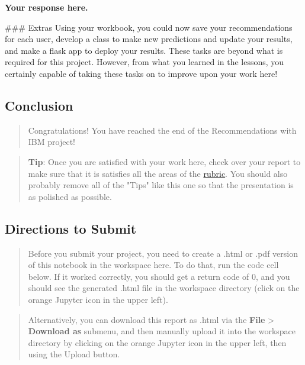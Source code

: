 \documentclass[11pt]{article}
\begin{document}
    \textbf{Your response here.}

     \#\#\# Extras Using your workbook, you could now save your
recommendations for each user, develop a class to make new predictions
and update your results, and make a flask app to deploy your results.
These tasks are beyond what is required for this project. However, from
what you learned in the lessons, you certainly capable of taking these
tasks on to improve upon your work here!

\subsection{Conclusion}\label{conclusion}

\begin{quote}
Congratulations! You have reached the end of the Recommendations with
IBM project!
\end{quote}

\begin{quote}
\textbf{Tip}: Once you are satisfied with your work here, check over
your report to make sure that it is satisfies all the areas of the
\href{https://review.udacity.com/\#!/rubrics/2322/view}{rubric}. You
should also probably remove all of the "Tips" like this one so that the
presentation is as polished as possible.
\end{quote}

\subsection{Directions to Submit}\label{directions-to-submit}

\begin{quote}
Before you submit your project, you need to create a .html or .pdf
version of this notebook in the workspace here. To do that, run the code
cell below. If it worked correctly, you should get a return code of 0,
and you should see the generated .html file in the workspace directory
(click on the orange Jupyter icon in the upper left).
\end{quote}

\begin{quote}
Alternatively, you can download this report as .html via the
\textbf{File} \textgreater{} \textbf{Download as} submenu, and then
manually upload it into the workspace directory by clicking on the
orange Jupyter icon in the upper left, then using the Upload button.
\end{quote}
\end{document}
